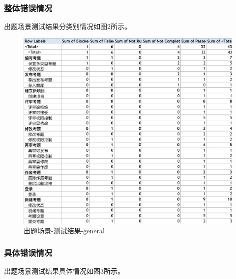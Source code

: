 \documentclass[hyperref, a4paper]{ctexart}
\begin{document}
\hypertarget{ux6574ux4f53ux9519ux8befux60c5ux51b5}{%
\subsubsection{整体错误情况}\label{ux6574ux4f53ux9519ux8befux60c5ux51b5}}

出题场景测试结果分类别情况如图2所示。

\begin{figure}
\centering
\includegraphics{screenshoots/PivotTable_general.png}
\caption{出题场景-测试结果-general}
\end{figure}

\hypertarget{ux5177ux4f53ux9519ux8befux60c5ux51b5}{%
\subsubsection{具体错误情况}\label{ux5177ux4f53ux9519ux8befux60c5ux51b5}}

出题场景测试结果具体情况如图3所示。
\end{document}
